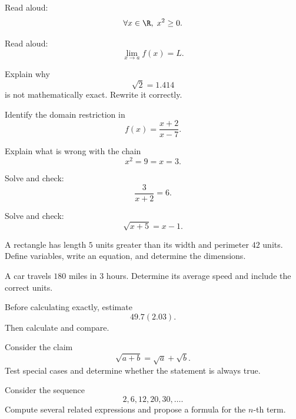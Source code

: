 \begin{exercise}[1]
Read aloud:
\[ \forall x\in\R,\;x^2\geq0. \]
\end{exercise}

\begin{exercise}[1]
Read aloud:
\[ \lim_{x\to a}f(x)=L. \]
\end{exercise}

\begin{exercise}[1]
Explain why
\[ \sqrt2=1.414 \]
is not mathematically exact. Rewrite it correctly.
\end{exercise}

\begin{exercise}[1]
Identify the domain restriction in
\[ f(x)=\frac{x+2}{x-7}. \]
\end{exercise}

\begin{exercise}[1]
Explain what is wrong with the chain
\[ x^2=9=x=3. \]
\end{exercise}

\begin{exercise}[2]
Solve and check:
\[ \frac{3}{x+2}=6. \]
\end{exercise}

\begin{exercise}[2]
Solve and check:
\[ \sqrt{x+5}=x-1. \]
\end{exercise}

\begin{exercise}[2]
A rectangle has length \(5\) units greater than its width and perimeter
\(42\) units. Define variables, write an equation, and determine the
dimensions.
\end{exercise}

\begin{exercise}[2]
A car travels \(180\) miles in \(3\) hours. Determine its average speed and
include the correct units.
\end{exercise}

\begin{exercise}[2]
Before calculating exactly, estimate
\[ 49.7(2.03). \]
Then calculate and compare.
\end{exercise}

\begin{exercise}[2]
Consider the claim
\[ \sqrt{a+b}=\sqrt a+\sqrt b. \]
Test special cases and determine whether the statement is always true.
\end{exercise}

\begin{exercise}[2]
Consider the sequence
\[ 2,6,12,20,30,\ldots. \]
Compute several related expressions and propose a formula for the \(n\)-th
term.
\end{exercise}

